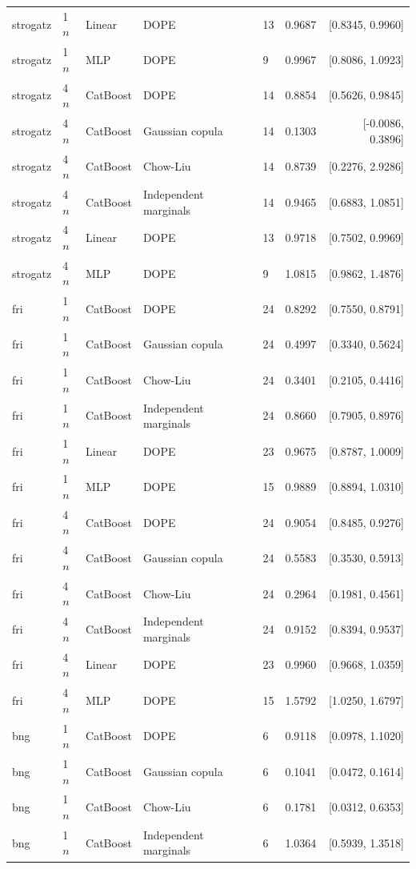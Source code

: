 \begin{longtable}{lllllrr}
strogatz & 1$n$ & Linear & DOPE & 13 & 0.9687 & [0.8345, 0.9960] \\
strogatz & 1$n$ & MLP & DOPE & 9 & 0.9967 & [0.8086, 1.0923] \\
strogatz & 4$n$ & CatBoost & DOPE & 14 & 0.8854 & [0.5626, 0.9845] \\
strogatz & 4$n$ & CatBoost & Gaussian copula & 14 & 0.1303 & [-0.0086, 0.3896] \\
strogatz & 4$n$ & CatBoost & Chow-Liu & 14 & 0.8739 & [0.2276, 2.9286] \\
strogatz & 4$n$ & CatBoost & Independent marginals & 14 & 0.9465 & [0.6883, 1.0851] \\
strogatz & 4$n$ & Linear & DOPE & 13 & 0.9718 & [0.7502, 0.9969] \\
strogatz & 4$n$ & MLP & DOPE & 9 & 1.0815 & [0.9862, 1.4876] \\
fri & 1$n$ & CatBoost & DOPE & 24 & 0.8292 & [0.7550, 0.8791] \\
fri & 1$n$ & CatBoost & Gaussian copula & 24 & 0.4997 & [0.3340, 0.5624] \\
fri & 1$n$ & CatBoost & Chow-Liu & 24 & 0.3401 & [0.2105, 0.4416] \\
fri & 1$n$ & CatBoost & Independent marginals & 24 & 0.8660 & [0.7905, 0.8976] \\
fri & 1$n$ & Linear & DOPE & 23 & 0.9675 & [0.8787, 1.0009] \\
fri & 1$n$ & MLP & DOPE & 15 & 0.9889 & [0.8894, 1.0310] \\
fri & 4$n$ & CatBoost & DOPE & 24 & 0.9054 & [0.8485, 0.9276] \\
fri & 4$n$ & CatBoost & Gaussian copula & 24 & 0.5583 & [0.3530, 0.5913] \\
fri & 4$n$ & CatBoost & Chow-Liu & 24 & 0.2964 & [0.1981, 0.4561] \\
fri & 4$n$ & CatBoost & Independent marginals & 24 & 0.9152 & [0.8394, 0.9537] \\
fri & 4$n$ & Linear & DOPE & 23 & 0.9960 & [0.9668, 1.0359] \\
fri & 4$n$ & MLP & DOPE & 15 & 1.5792 & [1.0250, 1.6797] \\
bng & 1$n$ & CatBoost & DOPE & 6 & 0.9118 & [0.0978, 1.1020] \\
bng & 1$n$ & CatBoost & Gaussian copula & 6 & 0.1041 & [0.0472, 0.1614] \\
bng & 1$n$ & CatBoost & Chow-Liu & 6 & 0.1781 & [0.0312, 0.6353] \\
bng & 1$n$ & CatBoost & Independent marginals & 6 & 1.0364 & [0.5939, 1.3518] \\

\end{longtable}

